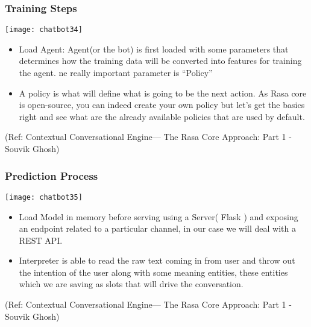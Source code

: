  \begin{frame}[fragile]\frametitle{Training Steps}
 

\begin{center}
\texttt{[image: chatbot34]}

\end{center}

\begin{itemize}
\item Load Agent: Agent(or the bot) is first loaded with some parameters that determines how the training data will be converted into features for training the agent. ne really important parameter is ``Policy''
\item A policy is what will define what is going to be the next action. As Rasa core is open-source, you can indeed create your own policy but let's get the basics right and see what are the already available policies that are used by default.
\end{itemize}


\tiny{(Ref: Contextual Conversational Engine— The Rasa Core Approach: Part 1 - Souvik Ghosh)}

\end{frame}

 \begin{frame}[fragile]\frametitle{Prediction Process}
 

\begin{center}
\texttt{[image: chatbot35]}

\end{center}

\begin{itemize}
\item Load Model in memory before serving using a Server( Flask ) and exposing an endpoint related to a particular channel, in our case we will deal with a REST API.
\item Interpreter is able to read the raw text coming in from user and throw out the intention of the user along with some meaning entities, these entities which we are saving as slots that will drive the conversation.
\end{itemize}


\tiny{(Ref: Contextual Conversational Engine— The Rasa Core Approach: Part 1 - Souvik Ghosh)}

\end{frame}

